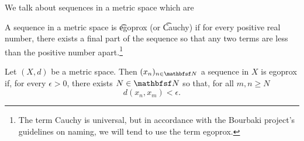 

We talk about sequences in a metric space which are 


A sequence in a metric space is \t{egoprox} (or \t{Cauchy}) if for every positive real number, there exists a final part of the sequence so that any two terms are less than the positive number apart.\footnote{The term Cauchy is universal, but in accordance with the Bourbaki project's guidelines on naming, we will tend to use the term egoprox.}


Let $(X, d)$ be a metric space.
Then $(x_n)_{n \in \N}$ a sequence in $X$ is egoprox if, for every $\epsilon > 0$, there exists $N \in \N$ so that, for all $m, n \geq N$
\[
  d(x_n, x_m) < \epsilon.
\]

\blankpage
